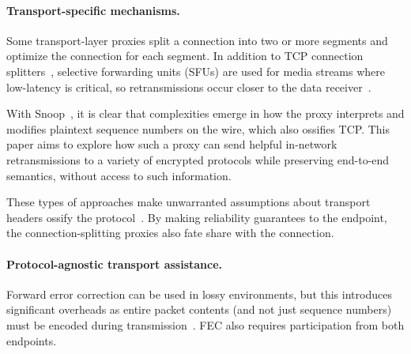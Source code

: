 \paragraph{Transport-specific mechanisms.}

Some transport-layer proxies split a connection into two or more segments
and optimize the connection for each segment. In addition to
TCP connection splitters~\cite{rfc3135,honda2011still,hayes2019mmwave},
selective forwarding units (SFUs) are
used for media streams where low-latency is critical, so retransmissions occur
closer to the data receiver~\cite{rfc7667,andre2018comparative}.


With Snoop~\cite{balakrishnan1995snoop}, it is clear
that complexities emerge in how the proxy interprets
and modifies plaintext sequence numbers on the wire, which also ossifies TCP.
This paper aims to explore how such a proxy can send helpful in-network
retransmissions to a variety of encrypted protocols while preserving
end-to-end semantics, without access to such information.


These types of approaches make unwarranted assumptions about
transport headers ossify the protocol~\cite{papastergiou2017deossifying}.
By making reliability guarantees to the endpoint, the connection-splitting
proxies also fate share with the connection.




\paragraph{Protocol-agnostic transport assistance.}

Forward error correction can be used in lossy environments, but this
introduces significant overheads as entire packet contents (and not just
sequence numbers) must be encoded during transmission~\cite
{rfc9265}. FEC also requires participation from both endpoints.

